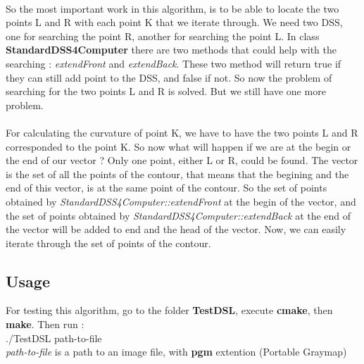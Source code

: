 \paragraph{}
So the most important work in this algorithm, is to be able to locate the two points L and R with each point K that we iterate through. We need two DSS, one for searching the point R, another for searching the point L. In class \textbf{StandardDSS4Computer} there are two methods that could help with the searching : \textit{extendFront} and \textit{extendBack}. These two method will return true if they can still add point to the DSS, and false if not. So now the problem of searching for the two points L and R is solved. But we still have one more problem.

\paragraph{}
For calculating the curvature of point K, we have to have the two points L and R corresponded to the point K. So now what will happen if we are at the begin or the end of our vector ? Only one point, either L or R, could be found. The vector is the set of all the points of the contour, that means that the begining and the end of this vector, is at the same point of the contour. So the set of points obtained by \textit{StandardDSS4Computer::extendFront} at the begin of the vector, and the set of points obtained by \textit{StandardDSS4Computer::extendBack} at the end of the vector will be added to end and the head of the vector. Now, we can easily iterate through the set of points of the contour.

\subsection{Usage}
For testing this algorithm, go to the folder \textbf{TestDSL}, execute \textbf{cmake}, then \textbf{make}. Then run :\\
./TestDSL path-to-file \\
\textit{path-to-file} is a path to an image file, with \textbf{pgm} extention (Portable Graymap)






